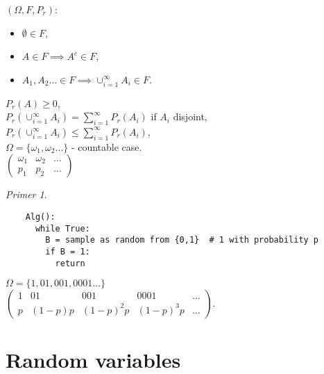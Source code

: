 \documentclass[a4paper, 12pt]{book}
\theoremstyle{definition}
\theoremstyle{remark}
\newtheorem*{ex}{Primer}
\begin{document}
$(\Omega, F, P_r)$:
\begin{itemize}[label=$\circ$]
  \item $\emptyset \in F$,
  \item $A \in F \implies A^c \in F$,
  \item $A_1, A_2 \dots \in F \implies \cup_{i=1}^{\infty} A_i \in F$.
\end{itemize}
$P_r(A) \geq 0$, \\
$P_r\left(\cup_{i=1}^{\infty} A_i\right) = \sum_{i=1}^{\infty} P_r(A_i)$ if $A_i$ disjoint, \\
$P_r\left(\cup_{i=1}^{\infty} A_i\right) \leq \sum_{i=1}^{\infty} P_r(A_i)$, \\
$\Omega = \{\omega_1, \omega_2 \dots\}$ - countable case. \\
$\begin{pmatrix}
  \omega_1 & \omega_2 & \dots \\
  p_1 & p_2 & \dots
\end{pmatrix}$
\begin{ex} \text{}
  \begin{verbatim}
    Alg():
      while True:
        B = sample as random from {0,1}  # 1 with probability p
        if B = 1:
          return
  \end{verbatim}
  $\Omega = \{1, 01, 001, 0001 \dots\}$ \\
  $\begin{pmatrix}
    1 & 01 & 001 & 0001 & \dots \\
    p & (1-p)p & (1-p)^2 p & (1-p)^3p & \dots
  \end{pmatrix}$.
\end{ex}


\section{Random variables}
\end{document}
